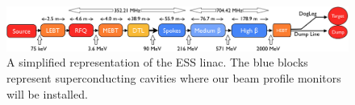 \begin{figure}[!ht]
	\begin{center}
		\includegraphics[width=\textwidth]{02_BeamDiag/figures/fig000_ESS_acc}
	\end{center}
	\caption[A simplified representation of the ESS linac]{A simplified representation of the ESS linac. The blue blocks represent superconducting cavities where our beam profile monitors will be installed.}
	\label{chap2:fig:ESS_acc}
\end{figure}
